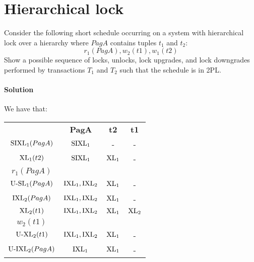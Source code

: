 \section{Hierarchical lock}

Consider the following short schedule occurring on a system with hierarchical lock over a hierarchy where $PagA$ contains tuples 
$t_1$ and $t_2$:
\[r_1( PagA ), w_2( t1 ), w_1( t2 )\]
Show a possible sequence of locks, unlocks, lock upgrades, and lock downgrades performed by transactions $T_1$ and $T_2$ such that
the schedule is in 2PL.

\paragraph*{Solution}
We have that: 
\begin{table}[H]
    \centering
    \begin{tabular}{c|ccc|}
    \cline{2-4}
    \textit{}                    & \textbf{PagA}                           & \textbf{t2}          & \textbf{t1}           \\ \cline{2-4} 
    $\textnormal{SIXL}_1(PagA)$  & $\textnormal{SIXL}_1$                   & -                    & -                     \\
    $\textnormal{XL}_1(t2)$      & $\textnormal{SIXL}_1$                   & $\textnormal{XL}_1$  & -                     \\
    $r_1(PagA)$                  &                                         &                      &                       \\
    $\textnormal{U-SL}_1(PagA)$  & $\textnormal{IXL}_1,\textnormal{IXL}_2$ & $\textnormal{XL}_1$  & -                     \\
    $\textnormal{IXL}_2(PagA)$   & $\textnormal{IXL}_1,\textnormal{IXL}_2$ & $\textnormal{XL}_1$  & -                     \\
    $\textnormal{XL}_2(t1)$      & $\textnormal{IXL}_1,\textnormal{IXL}_2$ & $\textnormal{XL}_1$  & $\textnormal{XL}_2$   \\
    $w_2(t1)$                    &                                         &                      &                       \\
    $\textnormal{U-XL}_2(t1)$    & $\textnormal{IXL}_1,\textnormal{IXL}_2$ & $\textnormal{XL}_1$  & -                     \\
    $\textnormal{U-IXL}_2(PagA)$ & $\textnormal{IXL}_1$                    & $\textnormal{XL}_1$  & -                     \\

\end{tabular}
\end{table}
